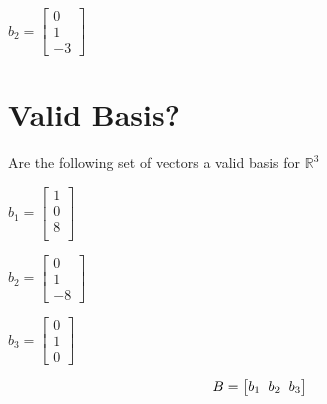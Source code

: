 \documentclass[11pt]{article}
\begin{document}
\begin{center}

 
$
b_2 = 
\begin{bmatrix}

0 \\
1 \\
-3

\end{bmatrix}
$
\end{center}

\section{Valid Basis?}

Are the following set of vectors a valid basis for $\mathbb{R}^3$

\begin{center}

 
$
b_1 = 
\begin{bmatrix}

1 \\
0 \\
8 \\

\end{bmatrix}
$
\end{center}

\begin{center}

 
$
b_2 = 
\begin{bmatrix}

0 \\
1 \\
-8

\end{bmatrix}
$
\end{center}

\begin{center}

 
$
b_3 = 
\begin{bmatrix}

0 \\
1 \\
0

\end{bmatrix}
$
\end{center}




\vspace{5mm}

\begin{center}
\[
B = 
\begin{bmatrix}
  b_1 \hspace{2mm} b_2 \hspace{2mm} b_3           
\end{bmatrix}
\]
\end{center}
\end{document}
